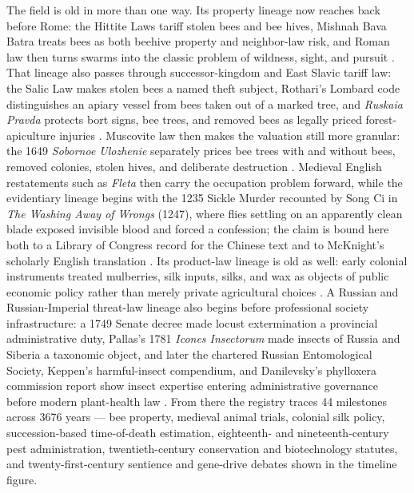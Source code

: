 \documentclass[
  english,
]{article}
\begin{document}
The field is old in more than one way. Its property lineage now reaches
back before Rome: the Hittite Laws tariff stolen bees and bee hives,
Mishnah Bava Batra treats bees as both beehive property and neighbor-law
risk, and Roman law then turns swarms into the classic problem of
wildness, sight, and pursuit
\citep{hittite_laws_bees, mishnah_bava_batra2_10_bees, mishnah_bava_batra5_3_beehive, justinian533, justinian_digest41}.
That lineage also passes through successor-kingdom and East Slavic
tariff law: the Salic Law makes stolen bees a named theft subject,
Rothari's Lombard code distinguishes an apiary vessel from bees taken
out of a marked tree, and \emph{Ruskaia Pravda} protects bort signs, bee
trees, and removed bees as legally priced forest-apiculture injuries
\citep{lex_salica_bees, edictum_rothari_bees, ruskaia_pravda_bees}.
Muscovite law then makes the valuation still more granular: the 1649
\emph{Sobornoe Ulozhenie} separately prices bee trees with and without
bees, removed colonies, stolen hives, and deliberate destruction
\citep{sobornoe_ulozhenie1649_bees}. Medieval English restatements such
as \emph{Fleta} then carry the occupation problem forward, while the
evidentiary lineage begins with the 1235 Sickle Murder recounted by Song
Ci in \emph{The Washing Away of Wrongs} (1247), where flies settling on
an apparently clean blade exposed invisible blood and forced a
confession; the claim is bound here both to a Library of Congress record
for the Chinese text and to McKnight's scholarly English translation
\citep{fleta1290_bees, songci1247, songci_mcknight1981}. Its product-law
lineage is old as well: early colonial instruments treated mulberries,
silk inputs, silks, and wax as objects of public economic policy rather
than merely private agricultural choices
\citep{virginia_assembly1619_mulberry, carolina_charter1663_silks_wax}.
A Russian and Russian-Imperial threat-law lineage also begins before
professional society infrastructure: a 1749 Senate decree made locust
extermination a provincial administrative duty, Pallas's 1781
\emph{Icones Insectorum} made insects of Russia and Siberia a taxonomic
object, and later the chartered Russian Entomological Society, Keppen's
harmful-insect compendium, and Danilevsky's phylloxera commission report
show insect expertise entering administrative governance before modern
plant-health law
\citep{russian_senate1749_locust_belgorod, pallas1781_icones_insectorum, russian_entomological_society1864_charter, keppen1881_harmful_insects, danilevsky1882_phylloxera}.
From there the registry traces 44 milestones across 3676 years --- bee
property, medieval animal trials, colonial silk policy, succession-based
time-of-death estimation, eighteenth- and nineteenth-century pest
administration, twentieth-century conservation and biotechnology
statutes, and twenty-first-century sentience and gene-drive debates
shown in the timeline figure.
\end{document}
